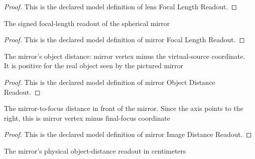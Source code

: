 \begin{proof}
  This is the declared model definition of lens Focal Length Readout.
\end{proof}
\begin{definition}
  \label{def:physics:phyx-mini-0076:phyxminiproblems-problemphyxmini0076-mirrorfocallengthreadout}
  The signed focal-length readout of the spherical mirror
\end{definition}
\begin{proof}
  This is the declared model definition of mirror Focal Length Readout.
\end{proof}
\begin{definition}
  \label{def:physics:phyx-mini-0076:phyxminiproblems-problemphyxmini0076-mirrorobjectdistancereadout}
  The mirror's object distance: mirror vertex minus the virtual-source coordinate. It is positive for the real object seen by the pictured mirror
\end{definition}
\begin{proof}
  This is the declared model definition of mirror Object Distance Readout.
\end{proof}
\begin{definition}
  \label{def:physics:phyx-mini-0076:phyxminiproblems-problemphyxmini0076-mirrorimagedistancereadout}
  The mirror-to-focus distance in front of the mirror. Since the axis points to the right, this is mirror vertex minus final-focus coordinate
\end{definition}
\begin{proof}
  This is the declared model definition of mirror Image Distance Readout.
\end{proof}
\begin{definition}
  \label{def:physics:phyx-mini-0076:phyxminiproblems-problemphyxmini0076-mirrorobjectdistanceincentimeters}
  The mirror's physical object-distance readout in centimeters
\end{definition}
